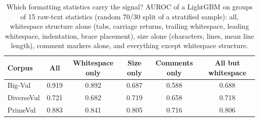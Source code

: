 \begin{table}[t]
\centering\footnotesize
\caption{Which formatting statistics carry the signal? AUROC of a LightGBM on groups of 15 raw-text statistics (random 70/30 split of a stratified sample): all, whitespace structure alone (tabs, carriage returns, trailing whitespace, leading whitespace, indentation, brace placement), size alone (characters, lines, mean line length), comment markers alone, and everything except whitespace structure.}\label{tab:formatabl}
\begin{tabular}{lccccc}
\toprule
Corpus & All & Whitespace only & Size only & Comments only & All but whitespace \\
\midrule
Big-Vul & 0.919 & 0.892 & 0.687 & 0.588 & 0.688 \\
DiverseVul & 0.721 & 0.682 & 0.719 & 0.658 & 0.718 \\
PrimeVul & 0.883 & 0.841 & 0.805 & 0.716 & 0.806 \\
\bottomrule
\end{tabular}
\end{table}
